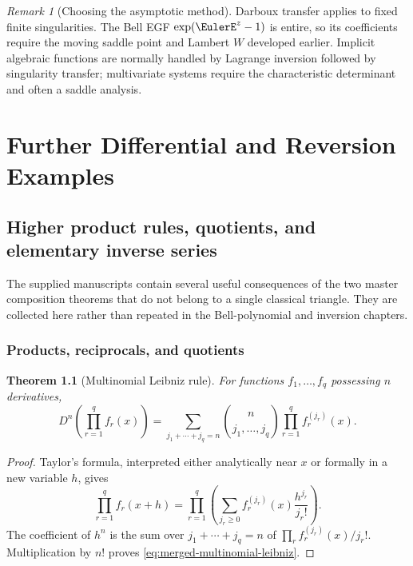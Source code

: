 \documentclass[11pt,a4paper,oneside,openany]{book}
\newtheorem{theorem}{Theorem}[chapter]
\theoremstyle{definition}
\theoremstyle{remark}
\newtheorem{remark}[theorem]{Remark}
\begin{document}
\begin{remark}[Choosing the asymptotic method]
Darboux transfer applies to fixed finite singularities.  The Bell EGF
$\exp(\EulerE^z-1)$ is entire, so its coefficients require the moving saddle point
and Lambert $W$ developed earlier.  Implicit algebraic functions are normally
handled by Lagrange inversion followed by singularity transfer; multivariate
systems require the characteristic determinant and often a saddle analysis.
\end{remark}

\part{Further Differential and Reversion Examples}

\chapter{Higher product rules, quotients, and elementary inverse series}
\label{ch:merged-further-calculus}

The supplied manuscripts contain several useful consequences of the two master
composition theorems that do not belong to a single classical triangle.  They
are collected here rather than repeated in the Bell-polynomial and inversion
chapters.

\section{Products, reciprocals, and quotients}

\begin{theorem}[Multinomial Leibniz rule]
\label{thm:merged-multinomial-leibniz}
For functions $f_1,\ldots,f_q$ possessing $n$ derivatives,
\begin{equation}
 D^n\!\left(\prod_{r=1}^{q}f_r(x)\right)
 =\sum_{j_1+\cdots+j_q=n}
   \binom{n}{j_1,\ldots,j_q}
   \prod_{r=1}^{q}f_r^{(j_r)}(x).                                  \label{eq:merged-multinomial-leibniz}
\end{equation}
\end{theorem}

\begin{proof}
Taylor's formula, interpreted either analytically near $x$ or formally in a
new variable $h$, gives
\[
 \prod_{r=1}^{q}f_r(x+h)
 =\prod_{r=1}^{q}\left(\sum_{j_r\geq0}
       f_r^{(j_r)}(x)\frac{h^{j_r}}{j_r!}\right).
\]
The coefficient of $h^n$ is the sum over $j_1+\cdots+j_q=n$ of
$\prod_r f_r^{(j_r)}(x)/j_r!$.  Multiplication by $n!$ proves
\eqref{eq:merged-multinomial-leibniz}.
\end{proof}
\end{document}
